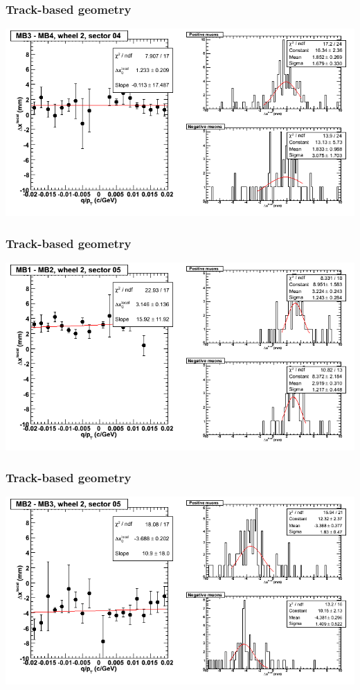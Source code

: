 \documentclass[compress]{beamer}
\begin{document}
\begin{frame}
\frametitle{Track-based geometry}
\includegraphics[width=\linewidth]{NOV4_segdiffs/dt13_resid_E_04_34.png}
\end{frame}

\begin{frame}
\frametitle{Track-based geometry}
\includegraphics[width=\linewidth]{NOV4_segdiffs/dt13_resid_E_05_12.png}
\end{frame}

\begin{frame}
\frametitle{Track-based geometry}
\includegraphics[width=\linewidth]{NOV4_segdiffs/dt13_resid_E_05_23.png}
\end{frame}
\end{document}
